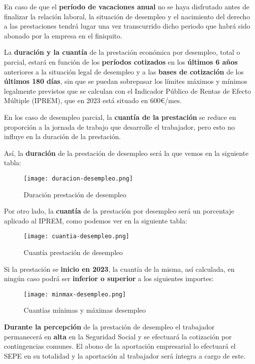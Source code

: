 En caso de que el \textbf{período de vacaciones anual} no se haya disfrutado antes de finalizar la relación laboral, la situación de desempleo y el nacimiento del derecho a las prestaciones tendrá lugar una vez transcurrido dicho periodo que habrá sido abonado por la empresa en el finiquito.

La \textbf{duración y la cuantía} de la prestación económica por desempleo, total o parcial, estará en función de los \textbf{períodos cotizados} en los \textbf{últimos 6 años} anteriores a la situación legal de desempleo y a las \textbf{bases de cotización} de los \textbf{últimos 180 días}, sin que se puedan sobrepasar los límites máximos y mínimos legalmente previstos que se calculan con el Indicador Público de Rentas de Efecto Múltiple (IPREM), que en 2023 está situado en 600€/mes.

En los caso de desempleo parcial, la \textbf{cuantía de la prestación} se reduce en proporción a la jornada de trabajo que desarrolle el trabajador, pero esto no influye en la duración de la prestación.

Así, la \textbf{duración} de la prestación de desempleo será la que vemos en la siguiente tabla:

\begin{figure}[H]
    \centering
    \texttt{[image: duracion-desempleo.png]}
    \caption{Duración prestación de desempleo}
\end{figure}

Por otro lado, la \textbf{cuantía} de la prestación por desempleo será un porcentaje aplicado al IPREM, como podemos ver en la siguiente tabla:

\begin{figure}[H]
    \centering
    \texttt{[image: cuantia-desempleo.png]}
    \caption{Cuantía prestación de desempleo}
\end{figure}

Si la prestación se \textbf{inicio en 2023}, la cuantía de la misma, así calculada, en ningún caso podrá ser \textbf{inferior o superior} a los siguientes importes:

\begin{figure}[H]
    \centering
    \texttt{[image: minmax-desempleo.png]}
    \caption{Cuantías mínimas y máximas desempleo}
\end{figure}

\textbf{Durante la percepción} de la prestación de desempleo el trabajador permanecerá en \textbf{alta} en la Seguridad Social y se efectuará la cotización por contingencias comunes. El abono de la aportación empresarial lo efectuará el SEPE en su totalidad y la aportación al trabajador será íntegra a cargo de este.

